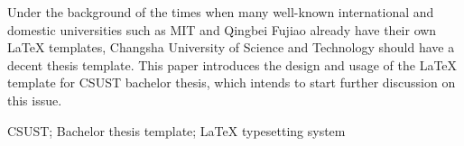 \begin{abstract}

在麻省理工、清北复交等众多国际国内知名大学早已拥有属于自己的 \LaTeX{} 模板的时代背景之下，长沙理工大学理应拥有一份像样的论文模板。本文介绍长沙理工大学本科生毕业论文 \LaTeX{} 模板的设计与使用说明，权当抛砖引玉。

 长沙理工大学；本科生毕业论文模板；\LaTeX 排版系统
\end{abstract}

\begin{abstract*}
  
Under the background of the times when many well-known international and domestic universities such as MIT and Qingbei Fujiao already have their own \LaTeX{} templates, Changsha University of Science and Technology should have a decent thesis template. This paper introduces the design and usage of the \LaTeX{} template for CSUST bachelor thesis, which intends to start further discussion on this issue.
  
 CSUST; Bachelor thesis template; \LaTeX{} typesetting system
\end{abstract*}













    


